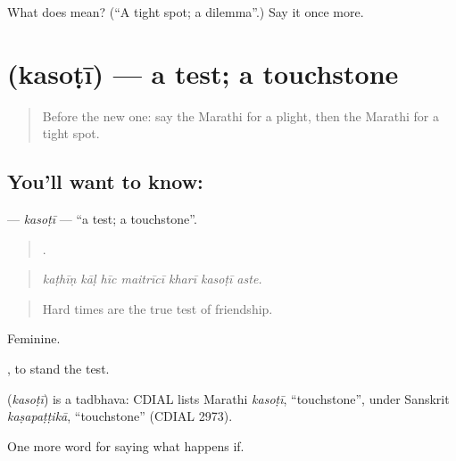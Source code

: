 \begin{tcolorbox}[breakable,colback=teal!4,colframe=teal!35!black,title={Before you move on}]
What does  mean? (\textquotedblleft{}A tight spot; a dilemma\textquotedblright{}.) Say it once more.
\end{tcolorbox}
\section[\texorpdfstring{\mr{कसोटी} (kasoṭī)}{कसोटी (kasoṭī)}]{ (kasoṭī) — a test; a touchstone}

\label{lesson:MR-C384-kasoti}



\begin{quote}
Before the new one: say the Marathi for a plight, then the Marathi for a tight spot.
\end{quote}

\subsection*{You'll want to know: }
\textbf{} — \emph{kasoṭī} — \textquotedblleft{}a test; a touchstone\textquotedblright{}.

\begin{quote}
      .
\end{quote}

\begin{quote}
\emph{kaṭhīṇ kāḷ hīc maitrīcī kharī kasoṭī aste.}
\end{quote}

\begin{quote}
Hard times are the true test of friendship.
\end{quote}

Feminine.

 , to stand the test.

\begin{cousinweb}
\textbf{} (\emph{kasoṭī}) is a tadbhava: CDIAL lists Marathi \emph{kasoṭī}, \textquotedblleft{}touchstone\textquotedblright{}, under Sanskrit \emph{kaṣapaṭṭikā}, \textquotedblleft{}touchstone\textquotedblright{} (CDIAL 2973).
\end{cousinweb}

\begin{grammarlens}[title={What you've built}]
One more word for saying what happens if.
\end{grammarlens}

